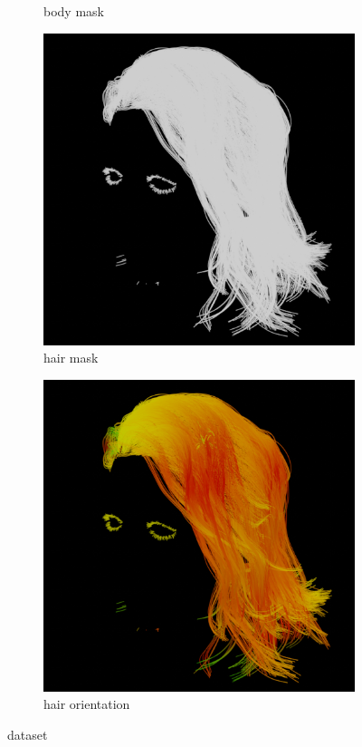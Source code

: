 \documentclass[12pt]{article}
\begin{document}
\begin{figure}[h]
\begin{subfigure}{0.24\textwidth}
		\caption{body mask}
	\end{subfigure}
	\hfill
	\begin{subfigure}{0.24\textwidth}
		\centering
		\includegraphics[width=\textwidth]{./images/0009_hairmask.png}
		\caption{hair mask}
	\end{subfigure}
	\hfill
	\begin{subfigure}{0.24\textwidth}
        \centering
        \includegraphics[width=\textwidth]{./images/0009_hairdir.png}
        \caption{hair orientation}
	\end{subfigure}

	\caption{dataset}
	\label{fig:dataset}
\end{figure}
\end{document}

